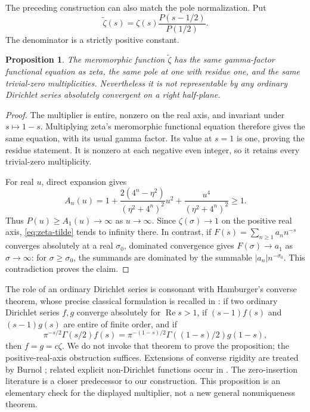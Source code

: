 \documentclass[11pt,a4paper]{article}
\newtheorem{proposition}[theorem]{Proposition}
\theoremstyle{definition}
\theoremstyle{remark}
\DeclareMathOperator{\Rea}{Re}
\begin{document}
The preceding construction can also match the pole normalization. Put
\begin{equation}\label{eq:zeta-tilde}
 \widetilde\zeta(s)=\zeta(s)\frac{P(s-1/2)}{P(1/2)}.
\end{equation}
The denominator is a strictly positive constant.

\begin{proposition}\label{prop:dirichlet}
The meromorphic function $\widetilde\zeta$ has the same gamma-factor
functional equation as zeta, the same pole at one with residue one, and
the same trivial-zero multiplicities. Nevertheless it is not representable
by any ordinary Dirichlet series absolutely convergent on a right half-plane.
\end{proposition}
\begin{proof}
The multiplier is entire, nonzero on the real axis, and invariant under
$s\mapsto1-s$. Multiplying zeta's meromorphic functional equation therefore
gives the same equation, with its usual gamma factor. Its value at $s=1$
is one, proving the residue statement. It is nonzero at each negative even
integer, so it retains every trivial-zero multiplicity.

For real $u$, direct expansion gives
\[
 A_n(u)=1+
 \frac{2(4^n-\eta^2)}{(\eta^2+4^n)^2}u^2+
 \frac{u^4}{(\eta^2+4^n)^2}\ge1.
\]
Thus $P(u)\ge A_1(u)\to\infty$ as $u\to\infty$. Since
$\zeta(\sigma)\to1$ on the positive real axis, \eqref{eq:zeta-tilde}
tends to infinity there. In contrast, if
$F(s)=\sum_{n\ge1}a_n n^{-s}$ converges absolutely at a real $\sigma_0$,
dominated convergence gives $F(\sigma)\to a_1$ as $\sigma\to\infty$:
for $\sigma\ge\sigma_0$, the summands are dominated by the summable
$|a_n|n^{-\sigma_0}$. This contradiction proves the claim.
\end{proof}

The role of an ordinary Dirichlet series is consonant with Hamburger's
converse theorem, whose precise classical formulation is recalled in
\cite[Introduction]{KMP}: if two ordinary Dirichlet series $f,g$ converge
absolutely for $\Rea s>1$, if $(s-1)f(s)$ and $(s-1)g(s)$ are entire of
finite order, and if
\[
 \pi^{-s/2}\Gamma(s/2)f(s)
 =\pi^{-(1-s)/2}\Gamma((1-s)/2)g(1-s),
\]
then $f=g=c\zeta$. We do not invoke that theorem to prove the proposition; the
positive-real-axis obstruction suffices. Extensions of converse rigidity are treated by Burnol \cite{Burnol};
related explicit non-Dirichlet functions occur in \cite{Nakamura}. The
zero-insertion literature \cite{GZ,GX} is a closer predecessor to our
construction. This proposition is an elementary check for the displayed
multiplier, not a new general nonuniqueness theorem.
\end{document}
